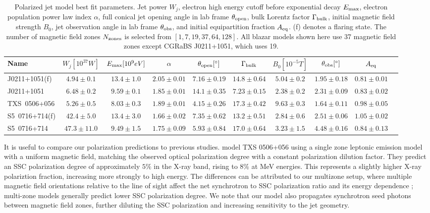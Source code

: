 \begin{table}[t]
\caption{Polarized jet model best fit parameters. Jet power $W_j$, electron high energy cutoff before exponential decay $E_{\rm max}$, electron population power law index $\alpha$, full conical jet opening angle in lab frame $\theta_{\rm open}$, bulk Lorentz factor $\Gamma_{\rm bulk}$, initial magnetic field strength $B_0$, jet observation angle in lab frame $\theta_{\rm obs}$, and initial equipartition fraction $A_{\rm eq}$. (f) denotes a flaring state. The number of magnetic field zones $N_{\rm zones}$ is selected from $[1,7,19,37,64,128]$. All blazar models shown here use 37 magnetic field zones except CGRaBS J0211+1051, which uses 19.}
\centering
\scriptsize
\begin{tabular}{lccccccccc}
    \toprule
    Name & $W_j [10^{37}W]$ &  {$E_{\rm max} [10^{9} eV]$} &  {$\alpha$}  &  {$\theta_{\rm open} [^\circ]$} &  {$\Gamma_{\rm bulk}$} &  {$B_0 [10^{-5}T]$} &  {$\theta_{\rm obs} [^\circ]$}  &  {$A_{\rm eq}$} \\
    \midrule
    J0211+1051(f) & $4.94 \pm 0.1$ & $13.4 \pm 1.0$ & $2.05 \pm 0.01 $ & $7.16 \pm 0.19$ & $14.8\pm 0.64$ & $5.04 \pm 0.2$ & $1.95\pm 0.18$ & $0.81\pm 0.01$\\
    J0211+1051 & $6.48 \pm 0.2$ & $9.59 \pm 0.1$ & $1.85 \pm 0.01 $ & $14.1 \pm 0.35$ & $7.23\pm 0.15$ & $2.38 \pm 0.2$ & $2.31\pm 0.09$ & $0.83\pm 0.02$\\
    TXS~0506+056 & $5.26 \pm 0.5$ & $8.03 \pm 0.3$ & $1.89 \pm 0.01 $ & $4.15 \pm 0.26$ & $17.3\pm 0.42$ & $9.63 \pm 0.3$ & $1.64\pm 0.11$ & $0.98\pm 0.05$\\
    S5~0716+714(f) & $42.4 \pm 5.0$ & $13.4 \pm 3.0$ & $1.66 \pm 0.02 $ & $7.35 \pm 0.62$ & $13.2\pm 0.51$ & $2.84 \pm 0.6$ & $2.51\pm 0.06$ & $1.05\pm 0.02$\\
    S5~0716+714 & $47.3 \pm 11.0$ & $9.49 \pm 1.5$ & $1.75 \pm 0.09 $ & $5.93 \pm 0.84$ & $17.0\pm 0.64$ & $3.23 \pm 1.5$ & $4.48\pm 0.16$ & $0.84\pm 0.13$\\
    \bottomrule
\end{tabular}
\label{tab:jet}
\end{table}

It is useful to compare our polarization predictions to previous studies. \citet{zhang_probing_2019} model TXS 0506+056 using a single zone leptonic emission model with a uniform magnetic field, matching the observed optical polarization degree with a constant polarization dilution factor. They predict an SSC polarization degree of approximately $5\%$ in the X-ray band, rising to $8\%$ at MeV energies. This represents a slightly higher X-ray polariztion fraction, increasing more strongly to high energy. The differences can be attributed to our multizone setup, where multiple magnetic field orientations relative to the line of sight affect the net synchrotron to SSC polarization ratio and its energy dependence \citep{bonometto_polarization_1973, peirson_polarization_2019}; multi-zone models generally predict lower SSC polarization degree. We note that our model also propagates synchrotron seed photons between magnetic field zones, further diluting the SSC polarization and increasing sensitivity to the jet geometry.

